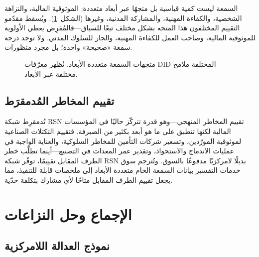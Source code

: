 \documentclass[11pt,a4paper,twocolumn]{article}
\begin{document}
السمعة ليست كمية قياسية بل متجهًا عبر أبعاد متعددة: الموثوقية المالية، والنزاهة الشخصية، والكفاءة المهنية، والمشاركة المدنية، وغيرها (الشكل~\ref{fig:reputation-radar}). ويُسقط مقدّمو التقييم المختلفون هذا المتجه بشكل مختلف تبعًا للسياق---فالمُقرِض يعطي الأولوية للموثوقية المالية، وصاحب العمل للكفاءة المهنية، والجار للسلوك المدني. ولا توجد درجة سمعة «صحيحة» واحدة؛ بل مجرد منظورات.

\begin{figure}[ht]
\centering
{}
\caption{متجهات السمعة متعددة الأبعاد. تُظهر معرّفات DID المختلفة ملامح مختلفة عبر الأبعاد.}
\label{fig:reputation-radar}
\end{figure}

\subsection{تقييم المخاطر المُدمقرَط}

تُدمقرِط شبكة RSN تقييم المخاطر المنهجي---وهو قدرة تتركّز حاليًا في المؤسسات المالية لكنها تنطبق على ما هو أبعد بكثير من الصيرفة. فتقييم التكتلات الصناعية لموثوقية المورّدين، وتسعير شركات التأمين للمخاطر السلوكية، والعناية الواجبة في عمليات الاندماج والاستحواذ، وتقدير عمر المعدات في التصنيع---أينما تطلّب خطر الطرف المقابل تقييمًا، توفّر شبكة RSN بديلًا لامركزيًا مدفوعًا بالسوق. وتُترجم سوق خدمات التفسير بيانات السمعة الخام متعددة الأبعاد إلى ملخصات قابلة للتنفيذ، مما يجعل تقييم الطرف المقابل متاحًا لأي مشارك بتكلفة حدّية.

\section{الإجماع وحل النزاعات}

\subsection{نموذج العدالة اللامركزية}
\end{document}
